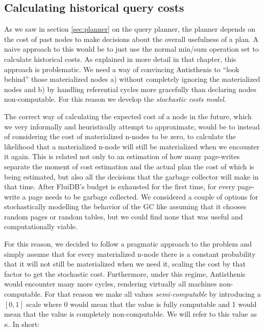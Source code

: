 \subsection{Calculating historical query costs}
\label{sec:historical_cost}

As we saw in section \ref{sec:planner} on the query planner, the
planner depends on the cost of past nodes to make decisions about the
overall usefulness of a plan. A naive approach to this would be to
just use the normal min/sum operation set to calculate historical
costs. As explained in more detail in that chapter, this approach is
problematic. We need a way of convincing Antisthenis to ``look
behind'' those materialized nodes a) without completely ignoring the
materialized nodes and b) by handling referential cycles more
gracefully than declaring nodes non-computable. For this reason we
develop the \emph{stochastic costs model}.

The correct way of calculating the expected cost of a node in the
future, which we very informally and heuristically attempt to
approximate, would be to instead of considering the cost of
materialized n-nodes to be zero, to calculate the likelihood that a
materialized n-node will still be materialized when we encounter it
again. This is related not only to an estimation of how many
page-writes separate the moment of cost estimation and the actual plan
the cost of which is being estimated, but also all the decisions that
the garbage collector will make in that time. After FluiDB's budget is
exhausted for the first time, for every page-write a page needs
to be garbage collected. We considered a couple of options for
stochastically modelling the behavior of the GC like assuming that it
chooses random pages or random tables, but we could find none that was
useful and computationally viable.

For this reason, we decided to follow a pragmatic approach to the
problem and simply assume that for every materialized n-node there is
a constant probability that it will not still be materialized when we
need it, scaling the cost by that factor to get the stochastic
cost. Furthermore, under this regime, Antisthenis would encounter many
more cycles, rendering virtually all machines non-computable. For that
reason we make all values \emph{semi-computable} by introducing a
\([0,1]\) scale where 0 would mean that the value is fully computable
and 1 would mean that the value is completely non-computable. We will
refer to this value as \(\kappa\). In short:

